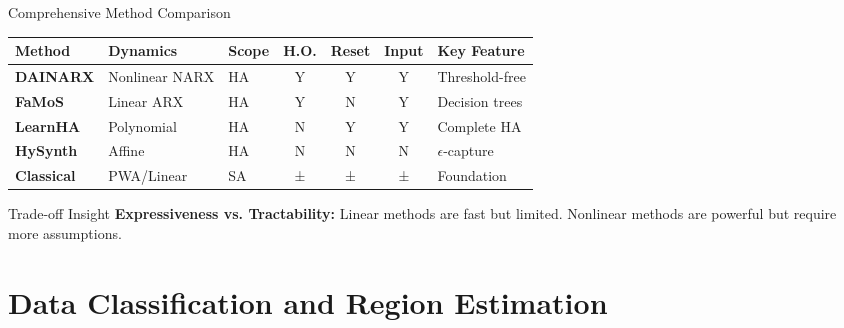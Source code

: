 \documentclass[aspectratio=169]{beamer}
\begin{document}
\begin{frame}{Comprehensive Method Comparison}
\vspace{-0.3cm}
\begin{center}
\scriptsize
\begin{tabular}{|l|l|l|c|c|c|l|}
\hline
\textbf{Method} & \textbf{Dynamics} & \textbf{Scope} & \textbf{H.O.} & \textbf{Reset} & \textbf{Input} & \textbf{Key Feature} \\
\hline
\textbf{DAINARX} & Nonlinear NARX & HA & Y & Y & Y & Threshold-free \\
\textbf{FaMoS} & Linear ARX & HA & Y & N & Y & Decision trees \\
\textbf{LearnHA} & Polynomial & HA & N & Y & Y & Complete HA \\
\textbf{HySynth} & Affine & HA & N & N & N & $\epsilon$-capture \\
\textbf{Classical} & PWA/Linear & SA & ± & ± & ± & Foundation \\
\hline
\end{tabular}
\end{center}

\vspace{0.2cm}
\begin{alertblock}{Trade-off Insight}
\textbf{Expressiveness vs. Tractability:} Linear methods are fast but limited. Nonlinear methods are powerful but require more assumptions.
\end{alertblock}
\end{frame}

\section{Data Classification and Region Estimation}
\end{document}
